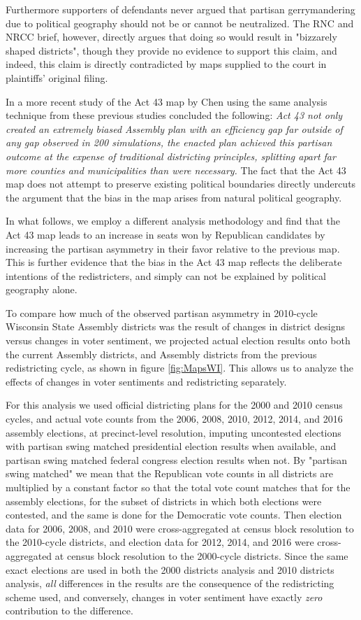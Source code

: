 \documentclass[preprint,12pt]{article}
\begin{document}
Furthermore supporters of defendants never argued that partisan gerrymandering due to political geography should not be or cannot be neutralized.
The RNC and NRCC brief, however, directly argues that doing so would result in "bizzarely shaped districts", though they provide no evidence to support this claim, and indeed, this claim is directly contradicted by maps supplied to the court in plaintiffs' original filing.

In a more recent study of the Act 43 map by Chen \cite{Chen_2017_} using the same analysis technique from these previous studies concluded the following: \emph{Act 43 not only created an extremely biased Assembly plan with an efficiency gap far outside of any gap observed in 200 simulations, the enacted plan achieved this partisan outcome at the expense of traditional districting principles, splitting apart far more counties and municipalities than were necessary.}
The fact that the Act 43 map does not attempt to preserve existing political boundaries directly undercuts the argument that the bias in the map arises from natural political geography.

In what follows, we employ a different analysis methodology and find that the Act 43 map leads to an increase in seats won by Republican candidates by increasing the partisan asymmetry in their favor relative to the previous map.
This is further evidence that the bias in the Act 43 map reflects the deliberate intentions of the redistricters, and simply can not be explained by political geography alone.

To compare how much of the observed partisan asymmetry in 2010-cycle Wisconsin State Assembly districts was the result of changes in district designs versus changes in voter sentiment, we projected actual election results onto both the current Assembly districts, and Assembly districts from the previous redistricting cycle, as shown in figure \ref{fig:MapsWI}.
This allows us to analyze the effects of changes in voter sentiments and redistricting separately.

For this analysis we used official districting plans for the 2000 and 2010 census cycles, and actual vote counts from the 2006, 2008, 2010, 2012, 2014, and 2016 assembly elections, at precinct-level resolution, imputing uncontested elections with partisan swing matched presidential election results when available, and partisan swing matched federal congress election results when not.
By "partisan swing matched" we mean that the Republican vote counts in all districts are multiplied by a constant factor so that the total vote count matches that for the assembly elections, for the subset of districts in which both elections were contested, and the same is done for the Democratic vote counts.
Then election data for 2006, 2008, and 2010 were cross-aggregated at census block resolution to the 2010-cycle districts, and election data for 2012, 2014, and 2016 were cross-aggregated at census block resolution to the 2000-cycle districts. 
Since the same exact elections are used in both the 2000 districts analysis and 2010 districts analysis, \emph{all} differences in the results are the consequence of the redistricting scheme used, and conversely, changes in voter sentiment have exactly \emph{zero} contribution to the difference.
\end{document}
